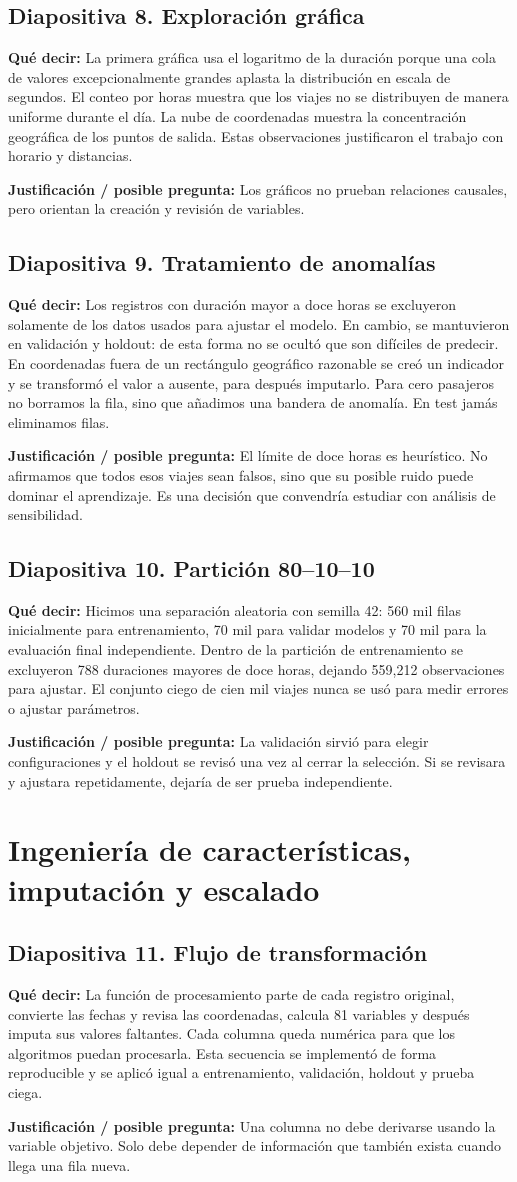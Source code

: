 \documentclass[11pt,letterpaper]{article}
\newcommand{\lamina}[2]{\subsection*{Diapositiva #1. #2}}
\newcommand{\explica}[1]{\noindent\textcolor{azul}{\textbf{Qué decir:}} #1\par\smallskip}
\newcommand{\defiende}[1]{\noindent\textcolor{verde}{\textbf{Justificación / posible pregunta:}} #1\par\medskip}
\begin{document}
\lamina{8}{Exploración gráfica}
\explica{La primera gráfica usa el logaritmo de la duración porque una cola de valores excepcionalmente grandes aplasta la distribución en escala de segundos. El conteo por horas muestra que los viajes no se distribuyen de manera uniforme durante el día. La nube de coordenadas muestra la concentración geográfica de los puntos de salida. Estas observaciones justificaron el trabajo con horario y distancias.}
\defiende{Los gráficos no prueban relaciones causales, pero orientan la creación y revisión de variables.}

\lamina{9}{Tratamiento de anomalías}
\explica{Los registros con duración mayor a doce horas se excluyeron solamente de los datos usados para ajustar el modelo. En cambio, se mantuvieron en validación y holdout: de esta forma no se ocultó que son difíciles de predecir. En coordenadas fuera de un rectángulo geográfico razonable se creó un indicador y se transformó el valor a ausente, para después imputarlo. Para cero pasajeros no borramos la fila, sino que añadimos una bandera de anomalía. En test jamás eliminamos filas.}
\defiende{El límite de doce horas es heurístico. No afirmamos que todos esos viajes sean falsos, sino que su posible ruido puede dominar el aprendizaje. Es una decisión que convendría estudiar con análisis de sensibilidad.}

\lamina{10}{Partición 80--10--10}
\explica{Hicimos una separación aleatoria con semilla 42: 560 mil filas inicialmente para entrenamiento, 70 mil para validar modelos y 70 mil para la evaluación final independiente. Dentro de la partición de entrenamiento se excluyeron 788 duraciones mayores de doce horas, dejando 559,212 observaciones para ajustar. El conjunto ciego de cien mil viajes nunca se usó para medir errores o ajustar parámetros.}
\defiende{La validación sirvió para elegir configuraciones y el holdout se revisó una vez al cerrar la selección. Si se revisara y ajustara repetidamente, dejaría de ser prueba independiente.}

\section{Ingeniería de características, imputación y escalado}
\lamina{11}{Flujo de transformación}
\explica{La función de procesamiento parte de cada registro original, convierte las fechas y revisa las coordenadas, calcula 81 variables y después imputa sus valores faltantes. Cada columna queda numérica para que los algoritmos puedan procesarla. Esta secuencia se implementó de forma reproducible y se aplicó igual a entrenamiento, validación, holdout y prueba ciega.}
\defiende{Una columna no debe derivarse usando la variable objetivo. Solo debe depender de información que también exista cuando llega una fila nueva.}
\end{document}
